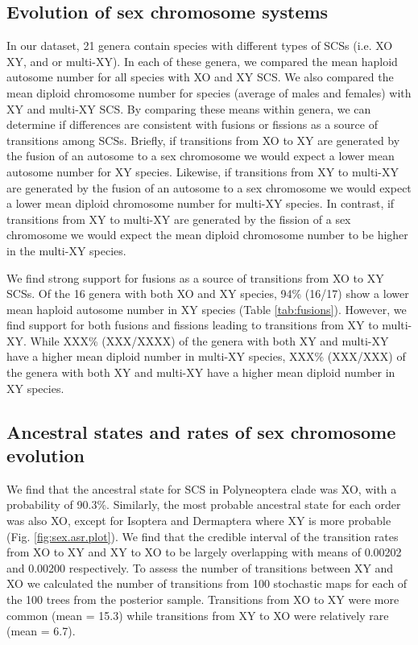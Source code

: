 \documentclass[]{rsos}%
\begin{document}
\subsection{Evolution of sex chromosome systems}
In our dataset, 21 genera contain species with different types of SCSs (i.e. XO XY, and or multi-XY).
In each of these genera, we compared the mean haploid autosome number for all species with XO and XY SCS.
We also compared the mean diploid chromosome number for species (average of males and females) with XY and multi-XY SCS.
By comparing these means within genera, we can determine if differences are consistent with fusions or fissions as a source of transitions among SCSs.
Briefly, if transitions from XO to XY are generated by the fusion of an autosome to a sex chromosome we would expect a lower mean autosome number for XY species. %
Likewise, if transitions from XY to multi-XY are generated by the fusion of an autosome to a sex chromosome we would expect a lower mean diploid chromosome number for multi-XY species.
In contrast, if transitions from XY to multi-XY are generated by the fission of a sex chromosome we would expect the mean diploid chromosome number to be higher in the multi-XY species.

We find strong support for fusions as a source of transitions from XO to XY SCSs.
Of the 16 genera with both XO and XY species, 94\% (16/17) show a lower mean haploid autosome number in XY species (Table \ref{tab:fusions}). 
However, we find support for both fusions and fissions leading to transitions from XY to multi-XY.
While XXX\% (XXX/XXXX) of the genera with both XY and multi-XY have a higher mean diploid number in multi-XY species, XXX\% (XXX/XXX) of the genera with both XY and multi-XY have a higher mean diploid number in XY species.

\subsection{Ancestral states and rates of sex chromosome evolution}
We find that the ancestral state for SCS in Polyneoptera clade was XO, with a probability of 90.3\%.
Similarly, the most probable ancestral state for each order was also XO, except for Isoptera and Dermaptera where XY is more probable (Fig. \ref{fig:sex.asr.plot}).
We find that the credible interval of the transition rates from XO to XY and XY to XO to be largely overlapping with means of 0.00202 and 0.00200 respectively. 
To assess the number of transitions between XY and XO we calculated the number of transitions from 100 stochastic maps for each of the 100 trees from the posterior sample.
Transitions from XO to XY were more common (mean = 15.3) while transitions from XY to XO were relatively rare (mean = 6.7).
\end{document}
